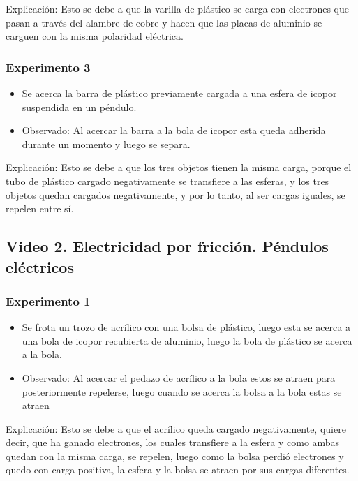 \documentclass[letterpaper, 12pt]{report}
\begin{document}
Explicación: Esto se debe a que la varilla de plástico se carga con
electrones que pasan a través del alambre de cobre y hacen que las placas
de aluminio se carguen con la misma polaridad
eléctrica.~\cite{GenerarCargaElectrica}

\subsubsection{Experimento 3}

\begin{itemize}
	\item Se acerca la barra de plástico previamente cargada a una esfera de
	      icopor suspendida en un péndulo.

	\item Observado: Al acercar la barra a la bola de icopor esta queda adherida durante
	      un momento y luego se separa.
\end{itemize}

Explicación: Esto se debe a que los tres objetos tienen la misma carga,
porque el tubo de plástico cargado negativamente se transfiere a las
esferas, y los tres objetos quedan cargados negativamente, y por lo tanto,
al ser cargas iguales, se repelen entre sí.~\cite{LeyCargasElectricas}

\subsection{Video 2. Electricidad por fricción. Péndulos eléctricos}

\subsubsection{Experimento 1}

\begin{itemize}
	\item Se frota un  trozo de acrílico con una bolsa de plástico,
	      luego esta se acerca a una bola de icopor recubierta de aluminio,
	      luego la bola de plástico se acerca a la bola.

	\item Observado: Al acercar el pedazo de acrílico a la bola estos se
	      atraen para posteriormente repelerse, luego cuando se acerca la bolsa
	      a la bola estas se atraen
\end{itemize}

Explicación: Esto se debe a que el acrílico queda cargado negativamente,
quiere decir, que ha ganado electrones, los cuales transfiere a la esfera
y como ambas quedan con la misma carga, se repelen, luego como la bolsa
perdió electrones y quedo con carga positiva, la esfera y la bolsa se
atraen por sus cargas diferentes.
~\cite{GenerarCargaElectrica}~\cite{LeyCargasElectricas}
\end{document}

